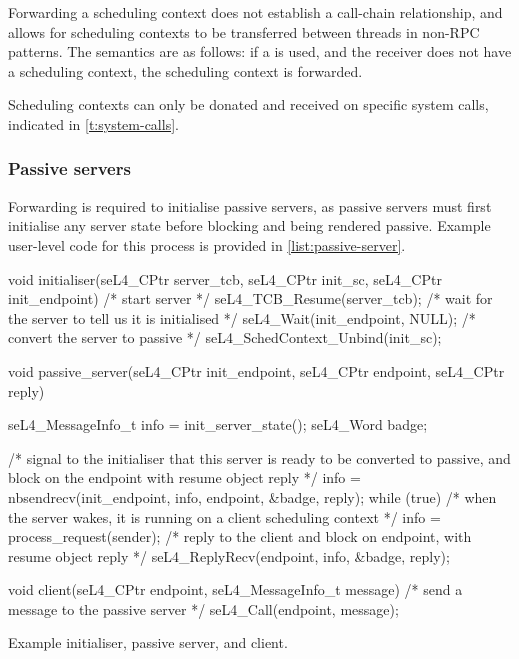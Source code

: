 Forwarding a scheduling context does not establish a call-chain relationship, and allows
for scheduling contexts to be transferred between threads in non-RPC patterns. The semantics are
as follows: if a \nbsendrecv is used, and the receiver does not have a scheduling context,
the scheduling context is forwarded. 

Scheduling contexts can only be donated and received on specific system calls, indicated in
\cref{t:system-calls}. 

\subsubsection{Passive servers}
\label{sec:impl-passive-servers}

Forwarding is required to initialise passive servers, as passive servers must first initialise any 
server state before blocking and being rendered passive. Example user-level code for this process is 
provided in \cref{list:passive-server}. 

\begin{listing}[t]
\begin{ccode}
    void initialiser(seL4_CPtr server_tcb, seL4_CPtr init_sc, seL4_CPtr init_endpoint) 
{
    /* start server */
    seL4_TCB_Resume(server_tcb);
    /* wait for the server to tell us it is initialised */
    seL4_Wait(init_endpoint, NULL);
    /* convert the server to passive */
    seL4_SchedContext_Unbind(init_sc);
}

void passive_server(seL4_CPtr init_endpoint, seL4_CPtr endpoint, seL4_CPtr reply) 
{    
    seL4_MessageInfo_t info = init_server_state();
    seL4_Word badge;

    /* signal to the initialiser that this server is ready 
       to be converted to passive, and block on the endpoint 
       with resume object reply */
    info = nbsendrecv(init_endpoint, info, endpoint, &badge, reply);
    while (true) {
        /* when the server wakes, it is running on a
           client scheduling context */
        info = process_request(sender);
        /* reply to the client and block on endpoint, with resume 
           object reply */
        seL4_ReplyRecv(endpoint, info, &badge, reply);
    }
}

void client(seL4_CPtr endpoint, seL4_MessageInfo_t message) {
    /* send a message to the passive server */
    seL4_Call(endpoint, message);
}
\end{ccode}
\caption{Example initialiser, passive server, and client.}
\label{list:passive-server}
\end{listing}

